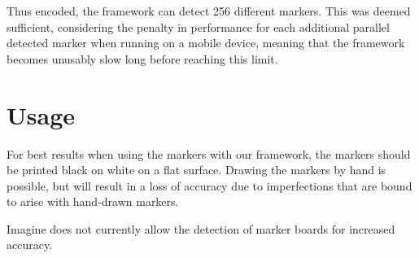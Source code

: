 Thus encoded, the framework can detect 256 different markers.
This was deemed sufficient, considering the penalty in performance for each additional parallel detected marker when running on a mobile device, meaning that the framework becomes unusably slow long before reaching this limit.

\section{Usage}

For best results when using the markers with our framework, the markers should be printed black on white on a flat surface.
Drawing the markers by hand is possible, but will result in a loss of accuracy due to imperfections that are bound to arise with hand-drawn markers.

Imagine does not currently allow the detection of marker boards for increased accuracy.
